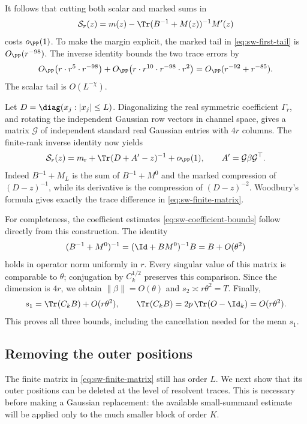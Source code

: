It follows that cutting both scalar and marked sums in
\[
 \mathcal S_r(z)=m(z)-\Tr(B^{-1}+M(z))^{-1}M'(z)
\]
costs \(o_{\PP}(1)\). To make the margin explicit, the marked tail in
\eqref{eq:sw-first-tail} is \(O_{\PP}(r^{-98})\). The inverse identity bounds
the two trace errors by
\[
 O_{\PP}\bigl(r\cdot r^5\cdot r^{-98}\bigr)
 +O_{\PP}\bigl(r\cdot r^{10}\cdot r^{-98}\cdot r^2\bigr)
 =O_{\PP}(r^{-92}+r^{-85}).
\]
The scalar tail is \(O(L^{-\chi})\).

Let \(D=\diag(x_j:|x_j|\le L)\).
Diagonalizing the real symmetric coefficient \(\Gamma_r\), and rotating
the independent Gaussian row vectors in channel space, gives a matrix
\(\mathcal G\) of independent standard real Gaussian entries with \(4r\)
columns. The finite-rank inverse identity now yields
\begin{equation}\label{eq:sw-finite-matrix}
 \mathcal S_r(z)
 =m_{\rm r}+\Tr(D+A'-z)^{-1}+o_{\PP}(1),
 \qquad A'=\mathcal G\beta\mathcal G^\top .
\end{equation}
Indeed \(B^{-1}+M_L\) is the sum of \(B^{-1}+M^0\) and the marked
compression of \((D-z)^{-1}\), while its derivative is the compression of
\((D-z)^{-2}\). Woodbury's formula gives exactly the trace difference
in \eqref{eq:sw-finite-matrix}.

For completeness, the coefficient estimates
\eqref{eq:sw-coefficient-bounds} follow directly from this construction.
The identity
\[
 (B^{-1}+M^0)^{-1}=(\Id+BM^0)^{-1}B=B+O(\theta^2)
\]
holds in operator norm uniformly in \(r\). Every singular value of this
matrix is comparable to \(\theta\); conjugation by \(C_k^{1/2}\) preserves
this comparison. Since the dimension is \(4r\), we obtain
\(\|\beta\|=O(\theta)\) and \(s_2\asymp r\theta^2=T\). Finally,
\[
 s_1=\Tr(C_kB)+O(r\theta^2),\qquad
 \Tr(C_kB)=2p\,\Tr(O-\Id_k)=O(r\theta^2).
\]
This proves all three bounds, including the cancellation needed for
the mean \(s_1\).

\subsection{Removing the outer positions}

The finite matrix in \eqref{eq:sw-finite-matrix} still has order \(L\).
We next show that its outer positions can be deleted at the level of
resolvent traces. This is necessary before making a Gaussian replacement:
the available small-summand estimate will be applied only to the much
smaller block of order \(K\).

